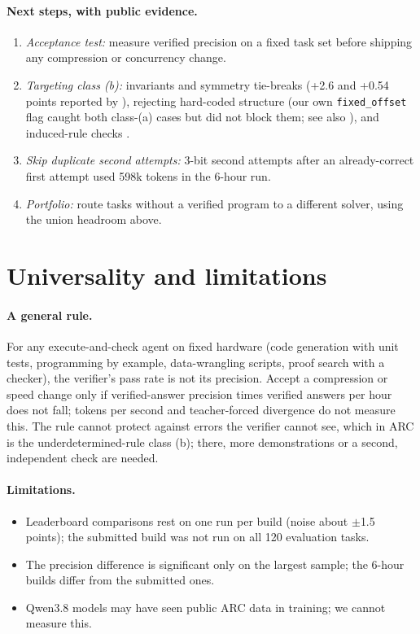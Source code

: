 \documentclass[11pt]{article}
\begin{document}
\paragraph{Next steps, with public evidence.}
\begin{enumerate}
\item \emph{Acceptance test:} measure verified precision on a fixed task set before shipping any compression or concurrency change.
\item \emph{Targeting class (b):} invariants and symmetry tie-breaks (+2.6 and +0.54 points reported by \cite{notnitsuj2026}), rejecting hard-coded structure (our own \texttt{fixed\_offset} flag caught both class-(a) cases but did not block them; see also \cite{majkel2026}), and induced-rule checks \cite{ni2026}.
\item \emph{Skip duplicate second attempts:} 3-bit second attempts after an already-correct first attempt used 598k tokens in the 6-hour run.
\item \emph{Portfolio:} route tasks without a verified program to a different solver, using the union headroom above.
\end{enumerate}

\section{Universality and limitations}
\paragraph{A general rule.} For any execute-and-check agent on fixed hardware (code generation with unit tests, programming by example, data-wrangling scripts, proof search with a checker), the verifier's pass rate is not its precision. Accept a compression or speed change only if verified-answer precision times verified answers per hour does not fall; tokens per second and teacher-forced divergence do not measure this. The rule cannot protect against errors the verifier cannot see, which in ARC is the underdetermined-rule class (b); there, more demonstrations or a second, independent check are needed.
\paragraph{Limitations.}
\begin{itemize}
\item Leaderboard comparisons rest on one run per build (noise about $\pm$1.5 points); the submitted build was not run on all 120 evaluation tasks.
\item The precision difference is significant only on the largest sample; the 6-hour builds differ from the submitted ones.
\item Qwen3.8 models may have seen public ARC data in training; we cannot measure this.
\end{itemize}
\end{document}

